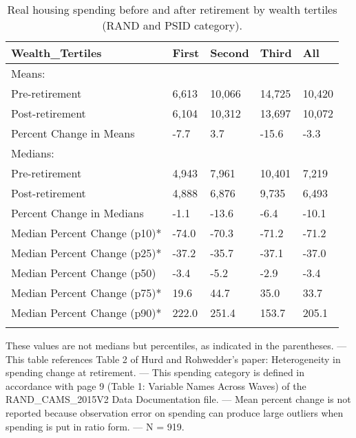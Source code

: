 \begin{table}[tbp] \centering
{}

\caption{Real housing spending before and after retirement by wealth tertiles (RAND and PSID category).}
\begin{tabularx}{\textwidth}{lCCCC}

\toprule
{Wealth\_Tertiles}&{First}&{Second}&{Third}&{All} \tabularnewline
\midrule\addlinespace[1.5ex]
Means:&&&& \tabularnewline
\midrule Pre-retirement&6,613&10,066&14,725&10,420 \tabularnewline
Post-retirement&6,104&10,312&13,697&10,072 \tabularnewline
Percent Change in Means&-7.7&3.7&-15.6&-3.3 \tabularnewline
\midrule Medians:&&&& \tabularnewline
\midrule Pre-retirement&4,943&7,961&10,401&7,219 \tabularnewline
Post-retirement&4,888&6,876&9,735&6,493 \tabularnewline
Percent Change in Medians&-1.1&-13.6&-6.4&-10.1 \tabularnewline
Median Percent Change (p10)*&-74.0&-70.3&-71.2&-71.2 \tabularnewline
Median Percent Change (p25)*&-37.2&-35.7&-37.1&-37.0 \tabularnewline
Median Percent Change (p50)&-3.4&-5.2&-2.9&-3.4 \tabularnewline
Median Percent Change (p75)*&19.6&44.7&35.0&33.7 \tabularnewline
Median Percent Change (p90)*&222.0&251.4&153.7&205.1 \tabularnewline
\bottomrule \addlinespace[1.5ex]

\end{tabularx}
\begin{flushleft}
\footnotesize *These values are not medians but percentiles, as indicated in the parentheses. \linebreak --- \linebreak This table references Table 2 of Hurd and Rohwedder's paper: Heterogeneity in spending change at retirement. \linebreak --- \linebreak This spending category is defined in accordance with page 9 (Table 1: Variable Names Across Waves) of the RAND\_CAMS\_2015V2 Data Documentation file. \linebreak --- \linebreak Mean percent change is not reported because observation error on spending can produce large outliers when spending is put in ratio form. \linebreak --- \linebreak N = 919.
\end{flushleft}
\end{table}
